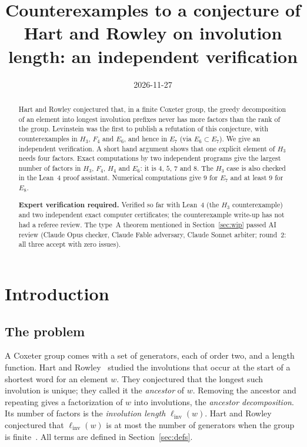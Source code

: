 \documentclass[11pt]{amsart}
\title[Involution length in finite Coxeter groups]{Counterexamples to a conjecture of Hart and Rowley on involution length: an independent verification}
\date{2026-11-27}
\theoremstyle{definition}\newtheorem{definition}[theorem]{Definition}
\theoremstyle{remark}\newtheorem{remark}[theorem]{Remark}
\newcommand{\linv}{\ell_{\mathrm{inv}}}
\begin{document}
\begin{abstract}
Hart and Rowley conjectured that, in a finite Coxeter group, the greedy decomposition of an element into longest involution prefixes never has more factors than the rank of the group. Levinstein was the first to publish a refutation of this conjecture, with counterexamples in \(H_3\), \(F_4\) and \(E_6\), and hence in \(E_7\) (via \(E_6\subset E_7\)). We give an independent verification. A short hand argument shows that one explicit element of \(H_3\) needs four factors. Exact computations by two independent programs give the largest number of factors in \(H_3\), \(F_4\), \(H_4\) and \(E_6\): it is \(4\), \(5\), \(7\) and \(8\). The \(H_3\) case is also checked in the Lean~4 proof assistant. Numerical computations give \(9\) for \(E_7\) and at least \(9\) for \(E_8\).

\textbf{Expert verification required.} Verified so far with Lean~4 (the \(H_3\) counterexample) and two independent exact computer certificates; the counterexample write-up has not had a referee review. The type~A theorem mentioned in Section~\ref{sec:wip} passed AI review (Claude Opus checker, Claude Fable adversary, Claude Sonnet arbiter; round~2: all three accept with zero issues).
\end{abstract}
\maketitle

\section{Introduction}\label{sec:intro}

\subsection*{The problem}
A Coxeter group comes with a set of generators, each of order two, and a length function. Hart and Rowley~\cite{HR} studied the involutions that occur at the start of a shortest word for an element \(w\). They conjectured that the longest such involution is unique; they called it the \emph{ancestor} of \(w\). Removing the ancestor and repeating gives a factorization of \(w\) into involutions, the \emph{ancestor decomposition}. Its number of factors is the \emph{involution length} \(\linv(w)\). Hart and Rowley conjectured that \(\linv(w)\) is at most the number of generators when the group is finite~\cite[Conj.~1.3]{HR}. All terms are defined in Section~\ref{sec:defs}.
\end{document}
